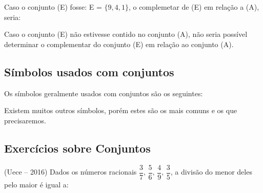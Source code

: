 \begin{multicols*}{2}
	Caso o conjunto (E) fosse: E = $\{9, 4, 1\}$, o complemetar de (E) em relação a (A), seria:


	Caso o conjunto (E) não estivesse contido no conjunto (A), não seria possível determinar o complementar do conjunto (E) em relação ao conjunto (A).

	\subsection{Símbolos usados com conjuntos}

	Os símbolos geralmente usados com conjuntos são os seguintes:\\













	Existem muitos outros símbolos, porém estes são os mais comuns e os que precisaremos.


	\subsection{Exercícios sobre Conjuntos}

		\setcounter{numexercicio}{0}
		\execnum (Uece – 2016) Dados os números racionais $ \dfrac{3}{7},\, \dfrac{5}{6},\, \dfrac{4}{9},\, \dfrac{3}{5}$, a divisão do menor deles pelo maior é igual a:


\end{multicols*}
